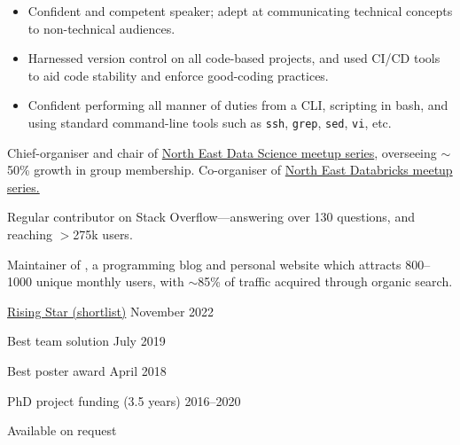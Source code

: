 \documentclass[12pt, a4paper]{article}
\begin{document}
\begin{itemize}[
    itemsep=.05em,
    labelwidth=2em,
    leftmargin=0em,
    topsep=0em]

    \item[] 
                   {Confident and competent speaker; adept at communicating technical concepts to
                    non-technical audiences.}%

    \item[] 
                   {Harnessed version control on all code-based projects, and used CI/CD tools to
                    aid code stability and enforce good-coding practices.}%

    \item[] 
                   {Confident performing all manner of duties from a CLI, scripting in bash, and
                    using standard command-line tools such as \texttt{ssh}, \texttt{grep},
                    \texttt{sed}, \texttt{vi}, etc.}%

\end{itemize}



       {Chief-organiser and chair of
        \href{https://www.meetup.com/newcastle-upon-tyne-data-science-meetup/}%
             {North East Data Science meetup series},
        overseeing $\sim$50\% growth in group membership. Co-organiser of 
        \href{https://www.meetup.com/north-east-databricks-meetup/}%
             {North East Databricks meetup series.}}

       {Regular contributor on Stack Overflow---answering over 130 questions,
        and reaching $>$275k users.}%

       {Maintainer of \href{https://\website}{\website}, a programming blog and
        personal website which attracts 800--1000 unique monthly users, with
        $\sim$85\% of traffic acquired through organic search.}



%
          {\href{https://www.dynamonortheast.co.uk/dynamites22-shortlist-unveiled/}%
                {Rising Star (shortlist)}}%
          {November 2022}

%
          {Best team solution}%
          {July 2019}

%
          {Best poster award}%
          {April 2018}

%
          {PhD project funding (3.5 years)}%
          {2016--2020}



Available on request
\end{document}
